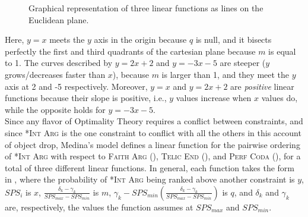 \begin{figure}[htb]
\caption{Graphical representation of three linear functions as lines on the Euclidean plane.}
\end{figure}

Here, $y = x$ meets the $y$ axis in the origin because $q$ is null, and it bisects perfectly the first and third quadrants of the cartesian plane because $m$ is equal to 1. The curves described by $y = 2x + 2$ and $y = -3x - 5$ are steeper ($y$ grows/decreases faster than $x$), because $m$ is larger than 1, and they meet the $y$ axis at 2 and -5 respectively. Moreover, $y = x$ and $y = 2x + 2$ are \textit{positive} linear functions because their slope is positive, i.e., $y$ values increase when $x$ values do, while the opposite holds for $y = -3x - 5$.\\
Since any flavor of Optimality Theory requires a conflict between constraints, and since \textsc{*Int Arg} is the one constraint to conflict with all the others in this account of object drop, Medina's model defines a linear function for the pairwise ordering of \textsc{*Int Arg} with respect to \textsc{Faith Arg} (), \textsc{Telic End} (), and \textsc{Perf Coda} (), for a total of three different linear functions. In general, each function takes the form in , where the probability of \textsc{*Int Arg} being ranked above another constraint is $y$, $SPS_i$ is $x$, $\frac{\delta_k - \gamma_k}{SPS_{max} - SPS_{min}}$ is $m$, $\gamma_k - SPS_{min} (\frac{\delta_k - \gamma_k}{SPS_{max} - SPS_{min}})$ is $q$, and $\delta_k$ and $\gamma_k$ are, respectively, the values the function assumes at $SPS_{max}$ and $SPS_{min}$.

